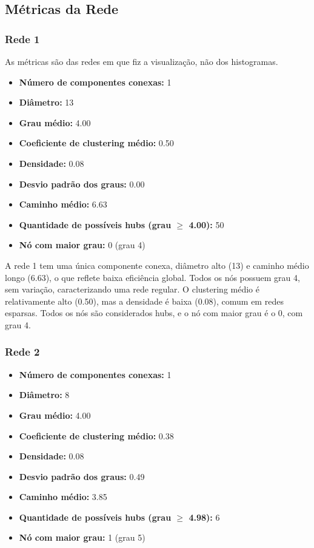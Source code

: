 \documentclass[a4paper]{article}
\begin{document}
\subsection*{Métricas da Rede}

\subsubsection{Rede 1}
As métricas são das redes em que fiz a visualização, não dos histogramas.
\begin{itemize}
    \item \textbf{Número de componentes conexas:} 1
    \item \textbf{Diâmetro:} 13
    \item \textbf{Grau médio:} 4.00
    \item \textbf{Coeficiente de clustering médio:} 0.50
    \item \textbf{Densidade:} 0.08
    \item \textbf{Desvio padrão dos graus:} 0.00
    \item \textbf{Caminho médio:} 6.63
    \item \textbf{Quantidade de possíveis hubs (grau $\geq$ 4.00):} 50
    \item \textbf{Nó com maior grau:} 0 (grau 4)
\end{itemize}

A rede 1 tem uma única componente conexa, diâmetro alto (13) e caminho médio longo (6.63), o que reflete baixa eficiência global. Todos os nós possuem grau 4, sem variação, caracterizando uma rede regular. O clustering médio é relativamente alto (0.50), mas a densidade é baixa (0.08), comum em redes esparsas. Todos os nós são considerados hubs, e o nó com maior grau é o 0, com grau 4.

\subsubsection{Rede 2}
\begin{itemize}
    \item \textbf{Número de componentes conexas:} 1
    \item \textbf{Diâmetro:} 8
    \item \textbf{Grau médio:} 4.00
    \item \textbf{Coeficiente de clustering médio:} 0.38
    \item \textbf{Densidade:} 0.08
    \item \textbf{Desvio padrão dos graus:} 0.49
    \item \textbf{Caminho médio:} 3.85
    \item \textbf{Quantidade de possíveis hubs (grau $\geq$ 4.98):} 6
    \item \textbf{Nó com maior grau:} 1 (grau 5)
\end{itemize}
\end{document}
